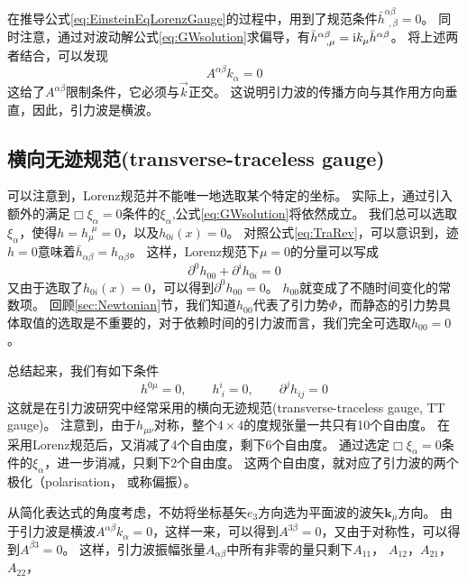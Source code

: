 在推导公式\ref{eq:EinsteinEqLorenzGauge}的过程中，用到了规范条件$\bar{h}^{\alpha\beta}_{~~,\beta} = 0$。
同时注意，通过对波动解公式\ref{eq:GWsolution}求偏导，有$\bar{h}^{\alpha\beta}_{~~ ,\mu} = {\rm i}k_\mu \bar{h}^{\alpha\beta}$。
将上述两者结合，可以发现
\begin{equation}\label{eq:Transverse} 
  A^{\alpha\beta} k_\alpha  = 0
\end{equation}
这给了$A^{\alpha\beta} $限制条件，它必须与$\vec{k}$正交。
这说明引力波的传播方向与其作用方向垂直，因此，引力波是横波。

\subsection{横向无迹规范(transverse-traceless gauge)}
可以注意到，Lorenz规范并不能唯一地选取某个特定的坐标。
实际上，通过引入额外的满足$\Box \xi_\alpha = 0$条件的$\xi_\alpha$,公式\ref{eq:GWsolution}将依然成立。
我们总可以选取$\xi_\alpha$，使得$h = h_\mu^{\,~\mu}= 0$，以及$h_{0i}(x)=0$。
对照公式\ref{eq:TraRev}，可以意识到，迹$h=0$意味着$\bar{h}_{\alpha\beta}=h_{\alpha\beta}$。
这样，Lorenz规范下$\mu=0$的分量可以写成
\begin{equation}\label{eq:Lorenz0} 
  \partial^0 h_{00} +\partial^i h_{0i}= 0
\end{equation}
又由于选取了$h_{0i}(x)=0$，可以得到$\partial^0 h_{00} = 0$。
$h_{00}$就变成了不随时间变化的常数项。
回顾\ref{sec:Newtonian}节，我们知道$h_{00}$代表了引力势$\Phi$，而静态的引力势具体取值的选取是不重要的，对于依赖时间的引力波而言，我们完全可选取$h_{00}=0$。

总结起来，我们有如下条件
\begin{equation}\label{eq:TTgauge} 
  h^{0\mu} =0, \qquad h^{i}_{~i} =0, \qquad \partial ^{j}h_{ij} =0 
\end{equation}
这就是在引力波研究中经常采用的横向无迹规范(transverse-traceless gauge, TT gauge)。
注意到，由于$h_{\mu\nu}$对称，整个$4\times 4$的度规张量一共只有10个自由度。
在采用Lorenz规范后，又消减了4个自由度，剩下6个自由度。
通过选定$\Box \xi_\alpha = 0$条件的$\xi_\alpha$，进一步消减，只剩下2个自由度。
这两个自由度，就对应了引力波的两个极化（polarisation， 或称偏振）。

从简化表达式的角度考虑，不妨将坐标基矢$e_3$方向选为平面波的波矢$\mathbf{k}_{\mu}$方向。
由于引力波是横波$A^{\alpha\beta} k_\alpha  = 0$，这样一来，可以得到$A^{3\beta} = 0$，又由于对称性，可以得到$A^{\beta 3} = 0$。
这样，引力波振幅张量$A_{\alpha\beta}$中所有非零的量只剩下$A_{11}$， $A_{12}$，$A_{21}$， $A_{22}$，

